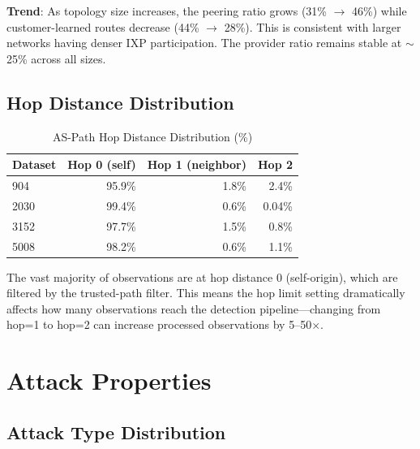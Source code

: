 \documentclass[11pt,a4paper]{article}
\begin{document}
\textbf{Trend}: As topology size increases, the peering ratio grows (31\% $\to$
46\%) while customer-learned routes decrease (44\% $\to$ 28\%). This is
consistent with larger networks having denser IXP participation. The provider
ratio remains stable at $\sim$25\% across all sizes.

\subsection{Hop Distance Distribution}

\begin{table}[H]
\centering
\caption{AS-Path Hop Distance Distribution (\%)}
\begin{tabular}{lrrr}
\toprule
\textbf{Dataset} & \textbf{Hop 0 (self)} & \textbf{Hop 1 (neighbor)} & \textbf{Hop 2} \\
\midrule
904   & 95.9\% & 1.8\% & 2.4\% \\
2030  & 99.4\% & 0.6\% & 0.04\% \\
3152  & 97.7\% & 1.5\% & 0.8\% \\
5008  & 98.2\% & 0.6\% & 1.1\% \\
\bottomrule
\end{tabular}
\end{table}

The vast majority of observations are at hop distance 0 (self-origin), which are
filtered by the trusted-path filter. This means the hop limit setting dramatically
affects how many observations reach the detection pipeline---changing from
hop=1 to hop=2 can increase processed observations by 5--50$\times$.

\section{Attack Properties}

\subsection{Attack Type Distribution}
\end{document}
